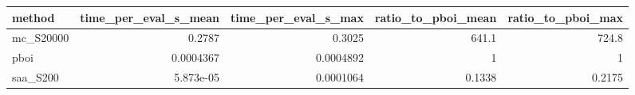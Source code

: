 \begin{tabular}{lrrrr}
\toprule
method & time_per_eval_s_mean & time_per_eval_s_max & ratio_to_pboi_mean & ratio_to_pboi_max \\
\midrule
mc_S20000 & 0.2787 & 0.3025 & 641.1 & 724.8 \\
pboi & 0.0004367 & 0.0004892 & 1 & 1 \\
saa_S200 & 5.873e-05 & 0.0001064 & 0.1338 & 0.2175 \\
\bottomrule
\end{tabular}
